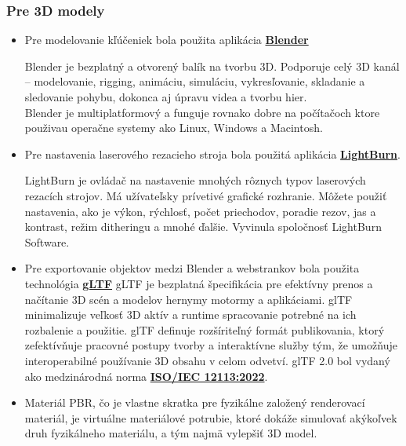       \subsubsection{Pre 3D modely}
        \begin{itemize}
          \item{
            Pre modelovanie kľúčeniek bola použita aplikácia \textbf{\href{https://www.blender.org/}{Blender}} 
            
            Blender je bezplatný a otvorený balík na tvorbu 3D. Podporuje celý 3D kanál – modelovanie, rigging, animáciu, simuláciu, vykresľovanie, skladanie a sledovanie pohybu, dokonca aj úpravu videa a tvorbu hier. \\
            Blender je multiplatformový a funguje rovnako dobre na počítačoch ktore použivau operačne systemy ako Linux, Windows a Macintosh.
          }
          \item{
              Pre nastavenia laserového rezacieho stroja bola použitá aplikácia \textbf{\href{https://lightburnsoftware.com/}{LightBurn}}.

              LightBurn je ovládač na nastavenie mnohých rôznych typov laserových rezacích strojov. Má užívateľsky prívetivé grafické rozhranie. Môžete použiť nastavenia, ako je výkon, rýchlosť, počet priechodov, poradie rezov, jas a kontrast, režim ditheringu a mnohé ďalšie. Vyvinula spoločnosť LightBurn Software.
          }
          \item{
            Pre exportovanie objektov medzi Blender a webstrankov bola použita technológia \textbf{\href{https://www.khronos.org/gltf/}{gLTF}}
            gLTF je bezplatná špecifikácia pre efektívny prenos a načítanie 3D scén a modelov hernymy motormy a aplikáciami. glTF minimalizuje veľkosť 3D aktív a runtime spracovanie potrebné na ich rozbalenie a použitie. glTF definuje rozšíriteľný formát publikovania, ktorý zefektívňuje pracovné postupy tvorby a interaktívne služby tým, že umožňuje interoperabilné používanie 3D obsahu v celom odvetví. glTF 2.0 bol vydaný ako medzinárodná norma \textbf{\href{https://www.iso.org/standard/83990.html}{ISO/IEC 12113:2022}}.
          }
          \item{
            Materiál PBR, čo je vlastne skratka pre fyzikálne založený renderovací materiál, je virtuálne materiálové potrubie, ktoré dokáže simulovať akýkoľvek druh fyzikálneho materiálu, a tým najmä vylepšiť 3D model.
          }
        \end{itemize}

